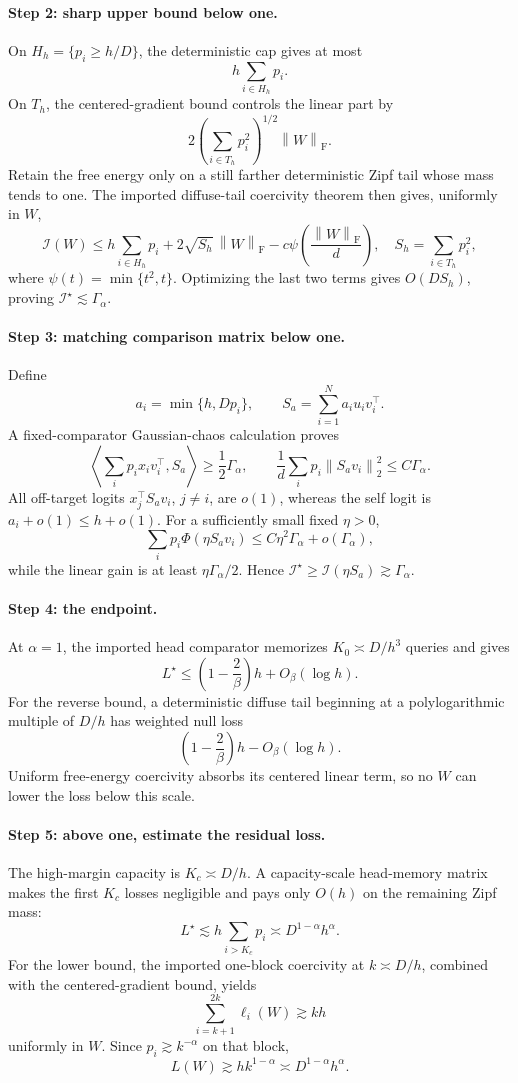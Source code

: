 \documentclass[11pt]{article}
\theoremstyle{remark}
\newcommand{\ip}[2]{\left\langle #1,#2\right\rangle}
\newcommand{\norm}[1]{\left\lVert #1\right\rVert}
\newcommand{\Frob}{\mathrm F}
\newcommand{\cI}{\mathcal I}
\begin{document}
\paragraph{Step 2: sharp upper bound below one.}
On \(H_h=\{p_i\geq h/D\}\), the deterministic cap gives at most
\[
 h\sum_{i\in H_h}p_i.
\]
On \(T_h\), the centered-gradient bound controls the linear part by
\[
 2\left(\sum_{i\in T_h}p_i^2\right)^{1/2}
 \norm W_{\Frob}.
\]
Retain the free energy only on a still farther deterministic Zipf tail
whose mass tends to one.  The imported diffuse-tail coercivity theorem
then gives, uniformly in \(W\),
\[
 \cI(W)
 \leq
 h\sum_{i\in H_h}p_i+
2\sqrt{S_h}\,\norm W_{\Frob}
-c\psi\!\left(\frac{\norm W_{\Frob}}d\right),
\quad
 S_h=\sum_{i\in T_h}p_i^2,
\]
where \(\psi(t)=\min\{t^2,t\}\).  Optimizing the last two terms gives
\(O(DS_h)\), proving \(\cI^\star\lesssim\Gamma_\alpha\).

\paragraph{Step 3: matching comparison matrix below one.}
Define
\[
 a_i=\min\{h,Dp_i\},\qquad
 S_a=\sum_{i=1}^Na_i u_iv_i^\top.
\]
A fixed-comparator Gaussian-chaos calculation proves
\[
 \ip{\sum_i p_ix_iv_i^\top}{S_a}
 \geq\frac12\Gamma_\alpha,
 \qquad
 \frac1d\sum_i p_i\norm{S_av_i}_2^2
 \leq C\Gamma_\alpha.
\]
All off-target logits \(x_j^\top S_av_i\), \(j\neq i\), are \(o(1)\),
whereas the self logit is \(a_i+o(1)\leq h+o(1)\).
For a sufficiently small fixed \(\eta>0\),
\[
 \sum_i p_i\Phi(\eta S_av_i)
 \leq C\eta^2\Gamma_\alpha+o(\Gamma_\alpha),
\]
while the linear gain is at least
\(\eta\Gamma_\alpha/2\).  Hence
\(\cI^\star\geq\cI(\eta S_a)\gtrsim\Gamma_\alpha\).

\paragraph{Step 4: the endpoint.}
At \(\alpha=1\), the imported head comparator memorizes
\(K_0\asymp D/h^3\) queries and gives
\[
 L^\star
 \leq\left(1-\frac2\beta\right)h+O_\beta(\log h).
\]
For the reverse bound, a deterministic diffuse tail beginning at a
polylogarithmic multiple of \(D/h\) has weighted null loss
\[
 \left(1-\frac2\beta\right)h-O_\beta(\log h).
\]
Uniform free-energy coercivity absorbs its centered linear term, so no
\(W\) can lower the loss below this scale.

\paragraph{Step 5: above one, estimate the residual loss.}
The high-margin capacity is \(K_c\asymp D/h\).  A capacity-scale
head-memory matrix makes the first \(K_c\) losses negligible and pays
only \(O(h)\) on the remaining Zipf mass:
\[
 L^\star\lesssim h\sum_{i>K_c}p_i
 \asymp D^{1-\alpha}h^\alpha.
\]
For the lower bound, the imported one-block coercivity at
\(k\asymp D/h\), combined with the centered-gradient bound, yields
\[
 \sum_{i=k+1}^{2k}\ell_i(W)\gtrsim kh
\]
uniformly in \(W\).  Since \(p_i\gtrsim k^{-\alpha}\) on that block,
\[
 L(W)\gtrsim hk^{1-\alpha}
 \asymp D^{1-\alpha}h^\alpha.
\]
\end{document}
